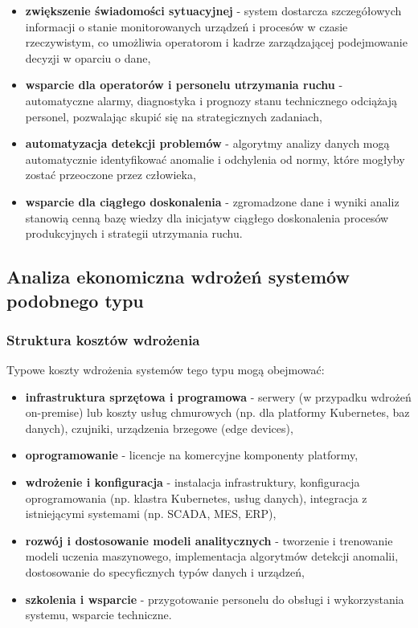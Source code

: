 \begin{itemize}
    \item \textbf{zwiększenie świadomości sytuacyjnej} - system dostarcza szczegółowych informacji o stanie monitorowanych urządzeń i procesów w czasie rzeczywistym, co umożliwia operatorom i kadrze zarządzającej podejmowanie decyzji w oparciu o dane,
    \item \textbf{wsparcie dla operatorów i personelu utrzymania ruchu} - automatyczne alarmy, diagnostyka i prognozy stanu technicznego odciążają personel, pozwalając skupić się na strategicznych zadaniach,
    \item \textbf{automatyzacja detekcji problemów} - algorytmy analizy danych mogą automatycznie identyfikować anomalie i odchylenia od normy, które mogłyby zostać przeoczone przez człowieka,
    \item \textbf{wsparcie dla ciągłego doskonalenia} - zgromadzone dane i wyniki analiz stanowią cenną bazę wiedzy dla inicjatyw ciągłego doskonalenia procesów produkcyjnych i strategii utrzymania ruchu.
\end{itemize}

\subsection{Analiza ekonomiczna wdrożeń systemów podobnego typu}
\label{subsec:analiza_ekonomiczna}

\subsubsection{Struktura kosztów wdrożenia}
\label{subsubsec:struktura_kosztow}

Typowe koszty wdrożenia systemów tego typu mogą obejmować:

\begin{itemize}
    \item \textbf{infrastruktura sprzętowa i programowa} - serwery (w przypadku wdrożeń on-premise) lub koszty usług chmurowych (np. dla platformy Kubernetes, baz danych), czujniki, urządzenia brzegowe (edge devices),
    \item \textbf{oprogramowanie} - licencje na komercyjne komponenty platformy,
    \item \textbf{wdrożenie i konfiguracja} - instalacja infrastruktury, konfiguracja oprogramowania (np. klastra Kubernetes, usług danych), integracja z istniejącymi systemami (np. SCADA, MES, ERP),
    \item \textbf{rozwój i dostosowanie modeli analitycznych} - tworzenie i trenowanie modeli uczenia maszynowego, implementacja algorytmów detekcji anomalii, dostosowanie do specyficznych typów danych i urządzeń,
    \item \textbf{szkolenia i wsparcie} - przygotowanie personelu do obsługi i wykorzystania systemu, wsparcie techniczne.
\end{itemize}

